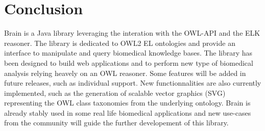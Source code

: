 \documentclass{llncs}
\begin{document}
\section{Conclusion}
Brain is a Java library leveraging the interation with the OWL-API and the ELK reasoner. The library is dedicated to OWL2 EL ontologies
and provide an interface to manipulate and query biomedical knowledge bases. The library has been designed to build web applications
and to perform new type of biomedical analysis relying heavely on an OWL reasoner.
Some features will be added in future releases, such as
individual support. New functionnalities are also currently implemented, such as the generation of scalable vector graphics (SVG) representing
the OWL class taxonomies from the underlying ontology. Brain is already stably used in some real life biomedical applications and new
use-cases from the community will guide the further developement of this library.
%


\end{document}
